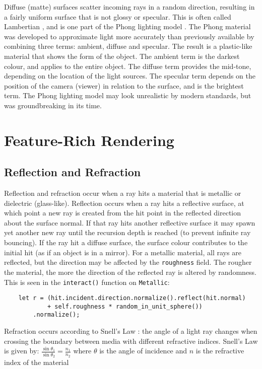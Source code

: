 \documentclass[a4paper]{article}
\begin{document}
Diffuse (matte) surfaces scatter incoming rays in a random direction, resulting in a fairly uniform surface that is not glossy or specular. This is often called Lambertian \cite{}, and is one part of the Phong lighting model \cite{}. The Phong material was developed to approximate light more accurately than previously available by combining three terms: ambient, diffuse and specular. The result is a plastic-like material that shows the form of the object. The ambient term is the darkest colour, and applies to the entire object. The diffuse term provides the mid-tone, depending on the location of the light sources. The specular term depends on the position of the camera (viewer) in relation to the surface, and is the brightest term. The Phong lighting model may look unrealistic by modern standards, but was groundbreaking in its time.

\section{Feature-Rich Rendering}
\subsection{Reflection and Refraction}\label{ss:reflandrefr}
Reflection and refraction occur when a ray hits a material that is metallic or dielectric (glass-like). Reflection occurs when a ray hits a reflective surface, at which point a new ray is created from the hit point in the reflected direction about the surface normal. If that ray hits another reflective surface it may spawn yet another new ray until the recursion depth is reached (to prevent infinite ray bouncing). If the ray hit a diffuse surface, the surface colour contributes to the initial hit (as if an object is in a mirror). For a metallic material, all rays are reflected, but the direction may be affected by the \texttt{roughness} field. The rougher the material, the more the direction of the reflected ray is altered by randomness. This is seen  in the \texttt{interact()} function on \texttt{Metallic}:

\begin{verbatim}
    let r = (hit.incident.direction.normalize().reflect(hit.normal)
            + self.roughness * random_in_unit_sphere())
        .normalize();
\end{verbatim}

Refraction occurs according to Snell's Law : the angle of a light ray changes when crossing the boundary between media with different refractive indices. Snell's Law is given by: $\frac{\sin \theta_{1}}{\sin \theta_{2}} = \frac{n_{1}}{n_{2}}$ where $\theta$ is the angle of incidence and $n$ is the refractive index of the material
\end{document}
